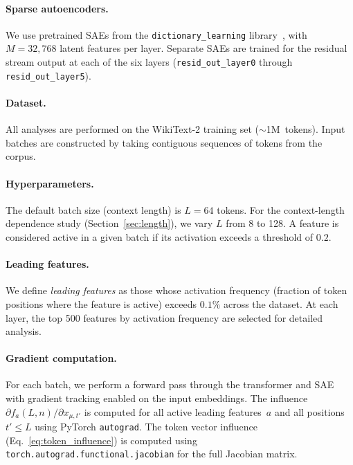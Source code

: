 \documentclass{article}
\begin{document}
\paragraph{Sparse autoencoders.}
We use pretrained SAEs from the \texttt{dictionary\_learning}
library~\citep{marks2024dictionary}, with $M = 32{,}768$ latent features
per layer. Separate SAEs are trained for the residual stream output at each
of the six layers (\texttt{resid\_out\_layer0} through
\texttt{resid\_out\_layer5}).

\paragraph{Dataset.}
All analyses are performed on the WikiText-2 training
set (${\sim}$1M~tokens). Input batches are constructed by taking contiguous
sequences of tokens from the corpus.

\paragraph{Hyperparameters.}
The default batch size (context length) is $L = 64$ tokens. For the
context-length dependence study (Section~\ref{sec:length}), we vary $L$
from 8 to 128. A feature is considered active in a given batch if its
activation exceeds a threshold of $0.2$.

\paragraph{Leading features.}
We define \emph{leading features} as those whose activation frequency
(fraction of token positions where the feature is active) exceeds $0.1\%$
across the dataset. At each layer, the top 500 features by activation
frequency are selected for detailed analysis.

\paragraph{Gradient computation.}
For each batch, we perform a forward pass through the transformer and SAE
with gradient tracking enabled on the input embeddings. The influence
$\partial f_a(L,n) / \partial x_{\mu,t'}$ is computed for all active
leading features~$a$ and all positions $t' \le L$ using PyTorch
\texttt{autograd}. The token vector influence
(Eq.~\eqref{eq:token_influence}) is computed using
\texttt{torch.autograd.functional.jacobian} for the full Jacobian matrix.

\end{document}
